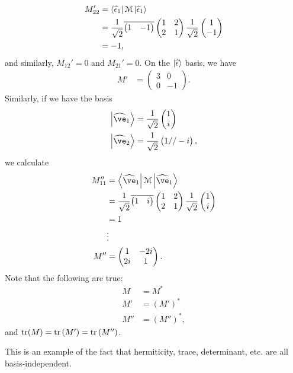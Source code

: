 \documentclass[10pt]{mypackage}
\begin{document}
\begin{example}
\begin{align*}
    M_{22}' &= \bra{\widehat{\epsilon}_1}\mathcal{M}\ket{\widehat{\epsilon}_1}\\
            &= \frac{1}{\sqrt{2}} \overline{ \begin{pmatrix}1 & -1\end{pmatrix} } \begin{pmatrix}1 & 2 \\ 2 & 1\end{pmatrix} \frac{1}{\sqrt{2}} \begin{pmatrix}1\\-1\end{pmatrix}\\
            &= -1,
  \end{align*}
  and similarly, $M_{12}' = 0$ and $M_{21}' = 0$. On the $\ket{\widehat{\epsilon}}$ basis, we have
  \begin{align*}
    M' &= \begin{pmatrix}3 & 0 \\ 0 & -1\end{pmatrix}.
  \end{align*}
  Similarly, if we have the basis
  \begin{align*}
    \ket{\widehat{\ve}_1} &= \frac{1}{\sqrt{2}}\begin{pmatrix}1\\i\end{pmatrix}\\
    \ket{\widehat{\ve}_2} &= \frac{1}{\sqrt{2}} \begin{pmatrix}1//-i\end{pmatrix},
  \end{align*}
  we calculate
  \begin{align*}
    M_{11}'' &= \bra{\widehat{\ve}_1}\mathcal{M}\ket{\widehat{\ve}_1}\\
             &= \frac{1}{\sqrt{2}} \overline{ \begin{pmatrix}1 & i\end{pmatrix} } \begin{pmatrix}1&2\\2&1\end{pmatrix} \frac{1}{\sqrt{2}} \begin{pmatrix}1\\i\end{pmatrix}\\
             &= 1\\
             &\vdots\\
    M'' &= \begin{pmatrix}1 & -2i\\2i & 1\end{pmatrix}.
  \end{align*}
  Note that the following are true:
  \begin{align*}
    M &= M^{\ast}\\
    M' &= \left(M'\right)^{\ast}\\
    M'' &= \left(M''\right)^{\ast},
  \end{align*}
  and $\tr(M) = \tr\left(M'\right) = \tr\left(M''\right)$.\newline

  This is an example of the fact that hermiticity, trace, determinant, etc. are all basis-independent.
\end{example}
\end{document}
